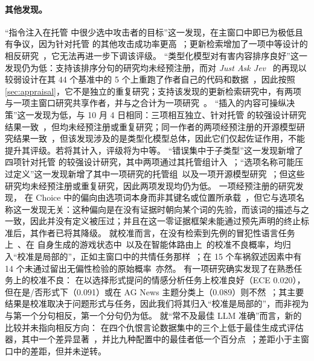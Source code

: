 \paragraph{其他发现。}
“指令注入在托管 \jev{} 中很少选中攻击者的目标”这一发现，在主窗口中即已为极低且有争议，因为针对托管 \jev{} 的其他攻击成功率更高~\cite{arx31142,checkpoint2026jev}；更新检索增加了一项中等设计的相反研究~\cite{arx04985}，它无法再进一步下调该评级。
“类型化模型对有害内容排序良好”这一发现仍为低：支持该排序分句的研究均未经预注册，而对 \emph{Just Ask Jev}~\cite{arx29429} 的再现以较弱设计在其 44 个基准中的 5 个上重跑了作者自己的代码和数据~\cite{jkf87_2026replication}\gmark{}，因此按照 \cref{sec:appraisal}，它不是独立的重复研究；支持该发现的更新检索研究中，有两项与一项主窗口研究共享作者，并与之合计为一项研究~\cite{zen22885291,zen23075657}\zmark{}。
“插入的内容可操纵决策”这一发现为低，与 10 月 4 日相同：三项相互独立、针对托管 \jev{} 的较强设计研究结果一致~\cite{arx31142,arx01834,arx01006}，但均未经预注册或重复研究；同一作者的两项经预注册的开源模型研究结果一致~\cite{zen22959854,zen23038928}\zmark{}，但该发现涉及的是类型化模型总体，因此它们仅起佐证作用，不能提升其评级。若将其计入，评级将为中等。
“错误集中于子类型”这一发现新增了四项针对托管 \jev{} 的较强设计研究，其中两项通过其托管组计入~\cite{arx07953,arx03324,arx08675,arx10321}；“选项名称可能压过定义”这一发现新增了其中一项研究的托管组~\cite{arx07953}以及一项开源模型研究~\cite{arx02586}；但这些研究均未经预注册或重复研究，因此两项发现均仍为低。
一项经预注册的研究发现，\jev{} 在 Choice 中的偏向由选项词本身而非其键名或位置所承载~\cite{zen23179064}\zmark{}，但它与选项名称这一发现无关：这种偏向是在没有证据时朝向某个词的先验，而该词的描述与之一致，因此并没有定义被压过；并且在这一零证据框架未能通过预先声明的终止标准后，其作者已将其降级。
就校准而言，在没有检索到先例的冒犯性语言任务上~\cite{arx07953}、在 \jev{} 自身生成的游戏状态中~\cite{zen23221456}\zmark{}以及在智能体路由上~\cite{arx02267}的校准不良概率，均归入“校准是局部的”，正如主窗口中的共情任务那样~\cite{arx24574}；在 15 个车祸叙述因素中有 14 个未通过留出无偏性检验的原始概率~\cite{arx10321}亦然。
有一项研究确实发现了在熟悉任务上的校准不良：\jev{} 在以选择形式提问的情感分析任务上校准良好（ECE 0.020），但在是/否形式下（0.091）或在 AG News 主题分类上（0.089）则不然~\cite{zen22935043}\zmark{}；其主要结果是校准取决于问题形式与任务，因此我们将其归入“校准是局部的”，而非视为与第一个分句相反，第一个分句仍为低。
就“常不及最佳 LLM 准确”而言，新的比较并未指向相反方向：\jev{} 在四个仇恨言论数据集中的三个上低于最佳生成式评估器，其中一个差异显著~\cite{arx03324}，并比九种配置中的最佳者低一个百分点~\cite{arx03935}；差距小于主窗口中的差距，但并未逆转。
